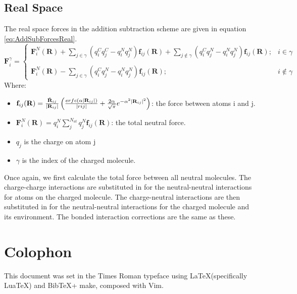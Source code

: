 \section{Real Space}
The real space forces in the addition subtraction scheme are given in equation \eqref{eq:AddSubForcesReal}.
\begin{equation}
  \mathbf{F}_{i}^{\gamma} = \left\lbrace \begin{array}{lc} \mathbf{F}_i^{N}(\mathbf{R}) + \sum_{j \in \gamma} (q_i^{C} q_j^C - q_{i}^N q_j^{N}) \mathbf{f}_{ij}(\mathbf{R}) + \sum_{j \notin \gamma} (q_i^{C} q_j^{N} - q_{i}^N q_j^{N}) \mathbf{f}_{ij}(\mathbf{R}); & i \in \gamma \\\\
\mathbf{F}_i^{N}(\mathbf{R}) - \sum_{j \in \gamma} (q_i^{C} q_j^N - q_{i}^N q_j^{N}) \mathbf{f}_{ij}(\mathbf{R}); & i \notin \gamma
\end{array} \right.
  \label{eq:AddSubForcesReal}
\end{equation}
Where:
\begin{itemize}
  \item $\mathbf{f}_{ij}(\mathbf{R}) = \frac{\hat{\mathbf{R}}_{ij}}{|\mathbf{R}_{ij}|} \left(\frac{erfc\left(\alpha |\mathbf{R}_{ij}| \right)}{|rij|} + \frac{2 \alpha}{\sqrt{\pi}} e^{-\alpha^2 |\mathbf{R}_{ij}|^2} \right)$: the force between atoms i and j.
  \item $\mathbf{F}_i^{N}(\mathbf{R}) = q_i^{N} \sum_{j}^{N_{at}} q_j^N \mathbf{f}_{ij}(\mathbf{R}) $: the total neutral force.
  \item $q_{j}$ is the charge on atom j
  \item $\gamma$ is the index of the charged molecule.
\end{itemize}
Once again, we first calculate the total force between all neutral molecules. The charge-charge interactions are substituted in for the neutral-neutral interactions for atoms on the charged molecule. The charge-neutral interactions are then substituted in for the neutral-neutral interactions for the charged molecule and its environment. The bonded interaction corrections are the same as these.

\chapter{Colophon}
\label{appendixlabel3}
This document was set in the Times Roman typeface using \LaTeX (specifically LuaTeX) and Bib\TeX + make, composed with Vim.
